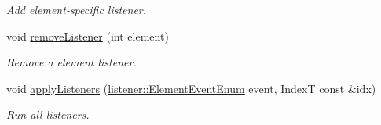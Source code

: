 \begin{DoxyCompactItemize}
\begin{DoxyCompactList}\small\item\em Add element-\/specific listener. \end{DoxyCompactList}\item 
void \hyperlink{structvt_1_1vrt_1_1collection_1_1_holder_ae54e9da47ea76dc7f6bb4cd12a135209}{remove\+Listener} (int element)
\begin{DoxyCompactList}\small\item\em Remove a element listener. \end{DoxyCompactList}\item 
void \hyperlink{structvt_1_1vrt_1_1collection_1_1_holder_a3859f44089ed23d724782d5687343061}{apply\+Listeners} (\hyperlink{namespacevt_1_1vrt_1_1collection_1_1listener_a96ace4b58b3d91759e7abda5cc33b012}{listener\+::\+Element\+Event\+Enum} event, IndexT const \&idx)
\begin{DoxyCompactList}\small\item\em Run all listeners. \end{DoxyCompactList}\end{DoxyCompactItemize}
